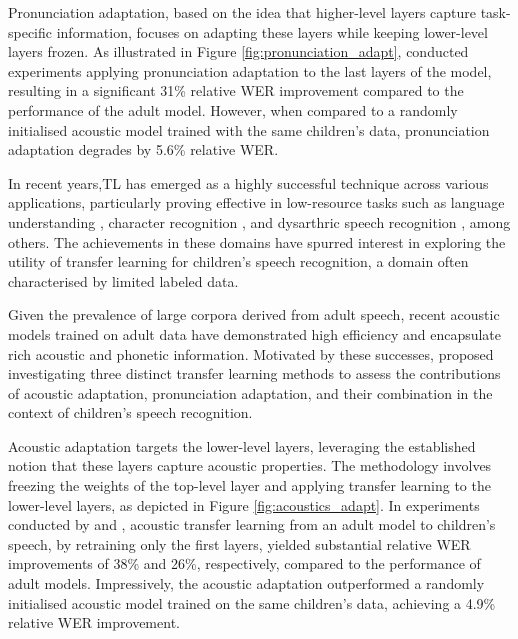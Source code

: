 Pronunciation adaptation, based on the idea that higher-level layers capture task-specific information, focuses on adapting these layers while keeping lower-level layers frozen. As illustrated in Figure \ref{fig:pronunciation_adapt}, \cite{TFchildren} conducted experiments applying pronunciation adaptation to the last layers of the model, resulting in a significant 31\% relative \ac{WER} improvement compared to the performance of the adult model. However, when compared to a randomly initialised acoustic model trained with the same children's data, pronunciation adaptation degrades by 5.6\% relative \ac{WER}.

In recent years,\ac{TL} has emerged as a highly successful technique across various applications, particularly proving effective in low-resource tasks such as language understanding \cite{Bert}, character recognition \cite{tfcharacter}, and dysarthric speech recognition \cite{tfpathology}, among others. The achievements in these domains have spurred interest in exploring the utility of transfer learning for children's speech recognition, a domain often characterised by limited labeled data.

Given the prevalence of large corpora derived from adult speech, recent acoustic models trained on adult data have demonstrated high efficiency and encapsulate rich acoustic and phonetic information. Motivated by these successes, \cite{TFchildren} proposed investigating three distinct transfer learning methods to assess the contributions of acoustic adaptation, pronunciation adaptation, and their combination in the context of children's speech recognition.

Acoustic adaptation targets the lower-level layers, leveraging the established notion that these layers capture acoustic properties. The methodology involves freezing the weights of the top-level layer and applying transfer learning to the lower-level layers, as depicted in Figure \ref{fig:acoustics_adapt}. In experiments conducted by \cite{TFchildren} and \cite{TransferLF}, acoustic transfer learning from an adult model to children's speech, by retraining only the first layers, yielded substantial relative \ac{WER} improvements of 38\% and 26\%, respectively, compared to the performance of adult models. Impressively, the acoustic adaptation outperformed a randomly initialised acoustic model trained on the same children's data, achieving a 4.9\% relative \ac{WER} improvement.

